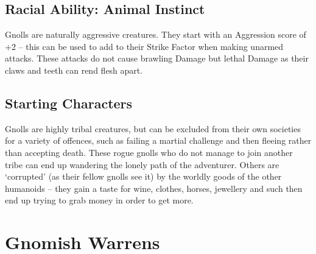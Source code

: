 \documentclass[titlepage,a4paper,openany]{book}
\begin{document}
\begin{multicols}{2}
\subsection{Racial Ability: Animal Instinct}

Gnolls are naturally aggressive creatures. They start with an Aggression score of +2 -- this can be used to add to their Strike Factor when making unarmed attacks. These attacks do not cause brawling Damage but lethal Damage as their claws and teeth can rend flesh apart.

\subsection{Starting Characters}

Gnolls are highly tribal creatures, but can be excluded from their own societies for a variety of offences, such as failing a martial challenge and then fleeing rather than accepting death. These rogue gnolls who do not manage to join another tribe can end up wandering the lonely path of the adventurer. Others are `corrupted' (as their fellow gnolls see it) by the worldly goods of the other humanoids -- they gain a taste for wine, clothes, horses, jewellery and such then end up trying to grab money in order to get more.

\end{multicols}

\section[Gnomes]{Gnomish Warrens}
\end{document}
